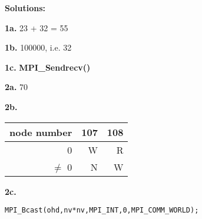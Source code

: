 \documentclass[twocolumn]{article}
\begin{document}
{\bf Solutions:}

{\bf 1a.}  23 + 32 = 55

{\bf 1b.} 100000, i.e. 32

{\bf 1c.} {\bf  MPI\_Sendrecv() }

{\bf 2a.} 70

{\bf 2b.}

\begin{tabular}{|r|r|r|}
\hline
node number & 107 & 108 \\ \hline 
0 & W & R \\ \hline 
$\neq$ 0 & N & W \\ \hline 
\end{tabular}

{\bf 2c.}

\begin{Verbatim}[fontsize=\relsize{-2}]
MPI_Bcast(ohd,nv*nv,MPI_INT,0,MPI_COMM_WORLD);
\end{Verbatim}
\end{document}
